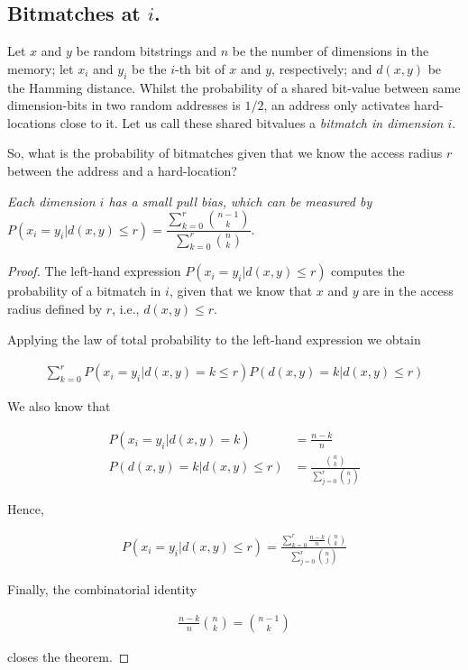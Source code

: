 

\subsection{Bitmatches at $i$.}

Let $x$ and $y$ be random bitstrings and $n$ be the number of dimensions in the memory; let $x_i$ and $y_i$ be the $i$-th bit of $x$ and $y$, respectively; and $d(x, y)$ be the Hamming distance. Whilst the probability of a shared bit-value between same dimension-bits in two random addresses is $1/2$, an address only activates hard-locations close to it.  Let us call these shared bitvalues a \emph{bitmatch in dimension $i$}.

So, what is the probability of bitmatches given that we know the access radius $r$ between the address and a hard-location?
\bigskip

\begin{theorem}
\emph{Each dimension $i$ has a small pull bias, which can be measured by}
\label{T1}
$P(x_i = y_i | d(x, y) \le r) = \dfrac{\sum_{k=0}^{r} \binom{n-1}{k}}{\sum_{k=0}^{r} \binom{n}{k}}.$
\end{theorem}

\begin{proof}
    The left-hand expression $P(x_i = y_i | d(x, y) \le r)$ computes the probability of a bitmatch in $i$, given that we know that $x$ and $y$ are in the access radius defined by $r$, i.e., $d(x, y)\le r$.

    Applying the law of total probability to the left-hand expression we obtain

    \begin{align}
    \sum_{k=0}^{r} P(x_i = y_i | d(x, y) = k \le r) P(d(x, y) = k | d(x, y) \le r)
    \end{align}

    We also know that

    \begin{align}
    P(x_i = y_i | d(x, y) = k) &= \frac{n-k}{n} \\
    P(d(x, y) = k | d(x, y) \le r) &= \frac{\binom{n}{k}}{\sum_{j=0}^{r} \binom{n}{j}}
    \end{align}

    Hence,

    \begin{align}
    P(x_i = y_i | d(x, y) \le r) = \frac{\sum_{k=0}^{r} \frac{n-k}{n} \binom{n}{k}}{\sum_{j=0}^{r} \binom{n}{j}}
    \end{align}

    Finally, the combinatorial identity

    \begin{align}
    \frac{n-k}{n} \binom{n}{k} = \binom{n-1}{k}
    \end{align}

    closes the theorem.

\end{proof}

